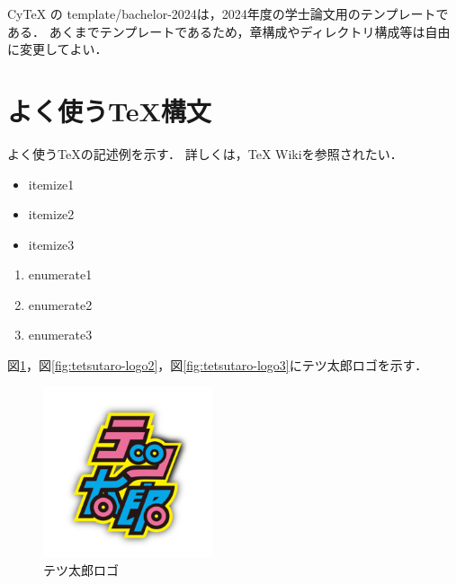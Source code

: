 CyTeX の template/bachelor-2024は，2024年度の学士論文用のテンプレートである．
あくまでテンプレートであるため，章構成やディレクトリ構成等は自由に変更してよい．


\section{よく使うTeX構文}
よく使うTeXの記述例を示す．
詳しくは，TeX Wiki\cite{TeXWiki}を参照されたい．

\begin{itemize}
    \item itemize1
    \item itemize2
    \item itemize3
\end{itemize}

\begin{enumerate}
    \item enumerate1
    \item enumerate2
    \item enumerate3
\end{enumerate}

図\ref{fig:tetsutaro-logo1}，図\ref{fig:tetsutaro-logo2}，図\ref{fig:tetsutaro-logo3}にテツ太郎ロゴを示す．

\begin{figure}[tb]
    \centering
    \includegraphics[clip,width=5cm]{assets/introduction/tetsutaro-logo.png}
    \caption{テツ太郎ロゴ}
    \label{fig:tetsutaro-logo1}
\end{figure}


